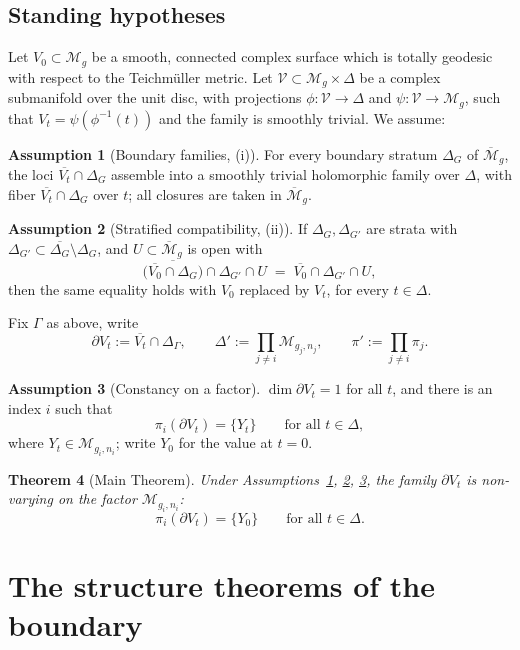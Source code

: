 \documentclass[11pt]{amsart}
\newtheorem{theorem}{Theorem}
\theoremstyle{definition}
\newtheorem{assumption}[theorem]{Assumption}
\theoremstyle{remark}
\newcommand{\M}{\mathcal{M}}
\newcommand{\V}{\mathcal{V}}
\begin{document}
\subsection{Standing hypotheses}
Let $V_0\subset \M_g$ be a smooth, connected complex surface which is totally
geodesic with respect to the Teichm\"uller metric. Let
$\V\subset \M_g\times\Delta$ be a complex submanifold over the unit disc,
with projections $\phi:\V\to\Delta$ and $\psi:\V\to\M_g$, such that
$V_t=\psi(\phi^{-1}(t))$ and the family is smoothly trivial. We assume:

\begin{assumption}[Boundary families, (i)]\label{ass:i}
For every boundary stratum $\Delta_G$ of $\overline{\M}_g$, the loci
$\overline{V_t}\cap \Delta_G$ assemble into a smoothly trivial holomorphic
family over $\Delta$, with fiber $\overline{V_t}\cap\Delta_G$ over $t$;
all closures are taken in $\overline{\M}_g$.
\end{assumption}

\begin{assumption}[Stratified compatibility, (ii)]\label{ass:ii}
If $\Delta_G,\Delta_{G'}$ are strata with $\Delta_{G'}\subset
\overline{\Delta_G}\setminus\Delta_G$, and $U\subset\overline{\M}_g$ is open
with
\[
\overline{\big(\overline{V_0}\cap\Delta_G\big)}\cap\Delta_{G'}\cap U
\;=\;
\overline{V_0}\cap\Delta_{G'}\cap U,
\]
then the same equality holds with $V_0$ replaced by $V_t$, for every
$t\in\Delta$.
\end{assumption}

Fix $\Gamma$ as above, write
\[
\partial V_t:=\overline{V_t}\cap\Delta_\Gamma,
\qquad
\Delta':=\prod_{j\neq i}\M_{g_j,n_j},
\qquad
\pi':=\prod_{j\neq i}\pi_j .
\]

\begin{assumption}[Constancy on a factor]\label{ass:const}
$\dim \partial V_t=1$ for all $t$, and there is an index $i$ such that
\[
\pi_i(\partial V_t)=\{Y_t\}\qquad\text{for all }t\in\Delta,
\]
where $Y_t\in\M_{g_i,n_i}$; write $Y_0$ for the value at $t=0$.
\end{assumption}

\begin{theorem}[Main Theorem]\label{thm:main}
Under Assumptions~\ref{ass:i}, \ref{ass:ii}, \ref{ass:const}, the family
$\partial V_t$ is non-varying on the factor $\M_{g_i,n_i}$:
\[
\pi_i(\partial V_t)=\{Y_0\}\qquad\text{for all }t\in\Delta .
\]
\end{theorem}

\section{The structure theorems of the boundary}\label{sec:prelim}
\end{document}
